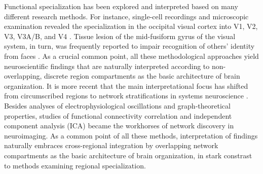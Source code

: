 \documentclass{article}
\begin{document}
Functional specialization has been
explored and interpreted based on many different research methods.
%
For instance,
single-cell recordings and microscopic examination
revealed the
specialization in the occipital visual cortex into V1, V2, V3, V3A/B, and V4
\cite{hubel1962receptive, zeki1978functional}.
Tissue lesion of the mid-fusiform gyrus of the visual system,
in turn,
was frequently reported to impair
recognition of others' identity from faces
\cite{iaria2008contrib}.
%
As a crucial common point,
all these methodological approaches
yield neuroscientific findings
that are naturally interpreted according to
non-overlapping, discrete region compartments
as the basic architecture of brain organization.
It is more recent
that the main interpretational focus has shifted
from circumscribed regions to network stratifications
in systems neuroscience \cite{yuste2015}.
%
Besides analyses of
electrophysiological oscillations
and
graph-theoretical properties,
studies of
functional connectivity correlation \cite{buckner2013opportunities} and
independent component analysis (ICA) \cite{beckmann2005}
became the workhorses of network discovery
in neuroimaging.
%
As a common point of all these methods,
interpretation of findings naturally embraces
cross-regional integration by
overlapping network compartments
as the basic architecture of brain organization,
in stark constrast to methods examining regional specialization.
\end{document}
